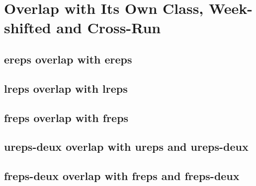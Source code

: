 \section{Overlap with Its Own Class, Week-shifted and Cross-Run}
\label{sec:tables-overx-self}
\subsection{ereps overlap with ereps}
\label{sub:tables-ereps-overx-ereps}

\subsection{lreps overlap with lreps}
\label{sub:tables-lreps-overx-lreps}

\subsection{freps overlap with freps}
\label{sub:tables-freps-overx-freps}

\subsection{ureps-deux overlap with ureps and ureps-deux}
\label{sub:tables-ureps-deux-overx-ureps}

\subsection{freps-deux overlap with freps and freps-deux}
\label{sub:tables-freps-deux-overx-ereps}
